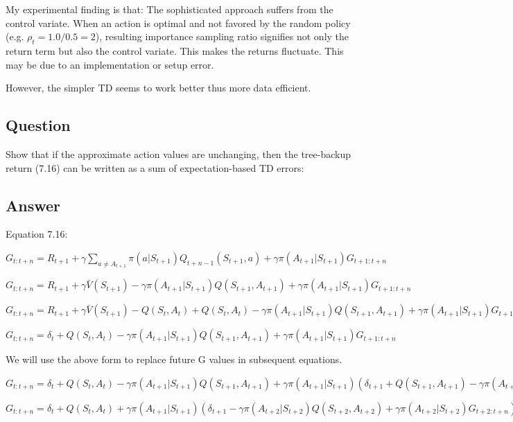 \documentclass[11pt]{article}
\begin{document}
    My experimental finding is that: The sophisticated approach suffers from the control variate.
    When an action is optimal and not favored by the random policy (e.g. $ \rho_t = 1.0/0.5 = 2 $), resulting importance sampling ratio signifies not only the return term but also the control variate.
    This makes the returns fluctuate.
    This may be due to an implementation or setup error.

    However, the simpler TD seems to work better thus more data efficient.

     \subsection{Question}

    Show that if the approximate action values are unchanging, then the tree-backup return (7.16) can be written as a sum of expectation-based TD errors:

    \subsection*{Answer}

    Equation 7.16:

    \noindent $ G_{t:t+n} = R_{t+1} + \gamma \sum_{a \neq A_{t+1}} \pi(a|S_{t+1}) Q_{t+n-1}(S_{t+1},a) + \gamma \pi(A_{t+1}|S_{t+1}) G_{t+1:t+n} $

    \noindent $ G_{t:t+n} = R_{t+1} + \gamma \bar{V}(S_{t+1}) - \gamma \pi(A_{t+1}|S_{t+1}) Q(S_{t+1},A_{t+1}) + \gamma \pi(A_{t+1}|S_{t+1}) G_{t+1:t+n} $

    \noindent $ G_{t:t+n} = R_{t+1} + \gamma \bar{V}(S_{t+1}) - Q(S_{t},A_{t}) + Q(S_{t},A_{t}) - \gamma \pi(A_{t+1}|S_{t+1}) Q(S_{t+1},A_{t+1}) + \gamma \pi(A_{t+1}|S_{t+1}) G_{t+1:t+n} $

    \noindent $ G_{t:t+n} = \delta_{t} + Q(S_{t},A_{t}) - \gamma \pi(A_{t+1}|S_{t+1}) Q(S_{t+1},A_{t+1}) + \gamma \pi(A_{t+1}|S_{t+1}) G_{t+1:t+n} $

    We will use the above form to replace future G values in subsequent equations.

    \noindent $ G_{t:t+n} = \delta_{t} + Q(S_{t},A_{t}) - \gamma \pi(A_{t+1}|S_{t+1}) Q(S_{t+1},A_{t+1}) + \gamma \pi(A_{t+1}|S_{t+1}) (\delta_{t+1} + Q(S_{t+1},A_{t+1}) - \gamma \pi(A_{t+2}|S_{t+2}) Q(S_{t+2},A_{t+2}) + \gamma \pi(A_{t+2}|S_{t+2}) G_{t+2:t+n}) $

    \noindent $ G_{t:t+n} = \delta_{t} + Q(S_{t},A_{t}) + \gamma \pi(A_{t+1}|S_{t+1}) (\delta_{t+1} - \gamma \pi(A_{t+2}|S_{t+2}) Q(S_{t+2},A_{t+2}) + \gamma \pi(A_{t+2}|S_{t+2}) G_{t+2:t+n})  $
\end{document}
